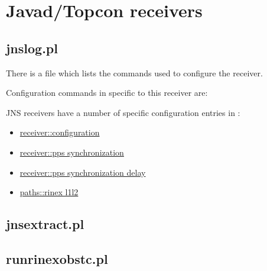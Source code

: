 \section{Javad/Topcon receivers}

\subsection{jnslog.pl}
\hypertarget{h:jnslog}{}
There is a file  which lists the commands used to configure the receiver.

Configuration commands in  specific to this receiver are:

JNS receivers have a number of specific configuration entries in :
\begin{itemize}
\item \hyperlink{h:configuration}{receiver::configuration}
\item \hyperlink{h:pps_synchronization}{receiver::pps synchronization}
\item \hyperlink{h:pps_synchronization_delay}{receiver::pps synchronization delay}
\item \hyperlink{h:rinex_l1l2}{paths::rinex l1l2}
\end{itemize}

\subsection{jnsextract.pl}
\hypertarget{h:jnsextract}{}

\subsection{runrinexobstc.pl}
